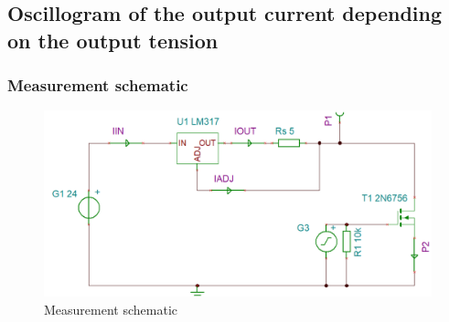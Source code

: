 \newpage
\subsection{Oscillogram of the output current depending on the output tension} \label{ssec:num13}
{
	
\subsubsection{Measurement schematic}
\begin{figure}[h]
	\centering
	\includegraphics[width=0.8\linewidth]{../../schemaMesurePulses}
	\caption{Measurement schematic}
	\label{fig:schemamesurepulses}
\end{figure}


}
\clearpage

